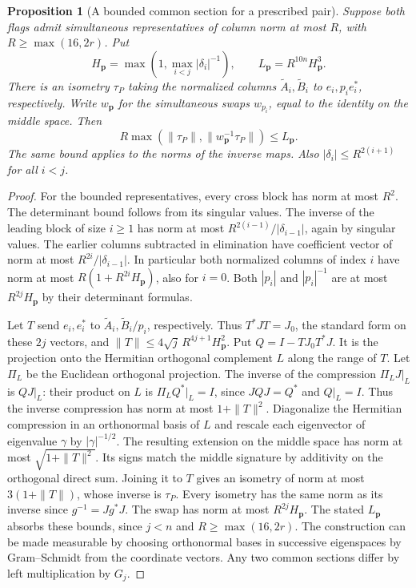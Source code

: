 \documentclass[a4paper,11pt]{article}
\newtheorem{proposition}{Proposition}[section]
\theoremstyle{definition}
\theoremstyle{remark}
\numberwithin{equation}{section}
\begin{document}
\begin{proposition}[A bounded common section for a prescribed pair]
\leavevmode\label{prop:flagsection922}
Suppose both flags admit simultaneous representatives of column
norm at most \(R\), with \(R\ge\max(16,2r)\). Put
\[
 H_{\mathbf p}=\max(1,\max_{i<j}|\delta_i|^{-1}),\qquad
 L_{\mathbf p}=R^{10n}H_{\mathbf p}^3.
\]
There is an isometry \(\tau_P\) taking the normalized columns
\(\widetilde A_i,\widetilde B_i\) to \(e_i,p_i e_i^*\),
respectively. Write \(w_{\mathbf p}\) for the simultaneous
swaps \(w_{p_i}\), equal to the identity on the middle space.
Then
\[
 R\max(\|\tau_P\|,\|w_{\mathbf p}^{-1}\tau_P\|)\le L_{\mathbf p}.
\]
The same bound applies to the norms of the inverse maps.
Also \(|\delta_i|\le R^{2(i+1)}\) for all \(i<j\).
\end{proposition}

\begin{proof}
For the bounded representatives, every cross block has norm at
most \(R^2\). The determinant bound follows from its singular values.
The inverse of the leading block of size \(i\ge1\) has norm at
most \(R^{2(i-1)}/|\delta_{i-1}|\), again by singular values.
The earlier columns subtracted in elimination have coefficient
vector of norm at most \(R^{2i}/|\delta_{i-1}|\). In particular
both normalized columns of index \(i\) have norm at most
\(R(1+R^{2i}H_{\mathbf p})\), also for \(i=0\).
Both \(|p_i|\) and \(|p_i|^{-1}\) are at most \(R^{2j}H_{\mathbf p}\)
by their determinant formulas.

Let \(T\) send \(e_i,e_i^*\) to
\(\widetilde A_i,\widetilde B_i/p_i\), respectively. Thus
\(T^*JT=J_0\), the standard form on these \(2j\) vectors, and
\(\|T\|\le4\sqrt j\,R^{4j+1}H_{\mathbf p}^2\).
Put \(Q=I-TJ_0T^*J\). It is the projection onto the Hermitian
orthogonal complement \(L\) along the range of \(T\). Let
\(\Pi_L\) be the Euclidean orthogonal projection. The inverse of
the compression \(\Pi_L J|_L\) is \(QJ|_L\): their product on
\(L\) is \(\Pi_L Q^*|_L=I\), since \(JQJ=Q^*\) and \(Q|_L=I\).
Thus the inverse compression has norm at most \(1+\|T\|^2\).
Diagonalize the Hermitian compression in an orthonormal basis
of \(L\) and rescale each eigenvector of eigenvalue \(\gamma\)
by \(|\gamma|^{-1/2}\). The resulting extension on the middle
space has norm at most \(\sqrt{1+\|T\|^2}\). Its signs match
the middle signature by additivity on the orthogonal direct
sum. Joining it to \(T\) gives an isometry of norm at most
\(3(1+\|T\|)\), whose inverse is \(\tau_P\). Every isometry
has the same norm as its inverse since \(g^{-1}=Jg^*J\).
The swap has norm at most \(R^{2j}H_{\mathbf p}\).
The stated \(L_{\mathbf p}\) absorbs these bounds, since
\(j<n\) and \(R\ge\max(16,2r)\).
The construction can be made measurable by choosing
orthonormal bases in successive eigenspaces by Gram--Schmidt
from the coordinate vectors. Any two common sections differ by
left multiplication by \(G_j\).
\end{proof}
\clearpage
\end{document}
